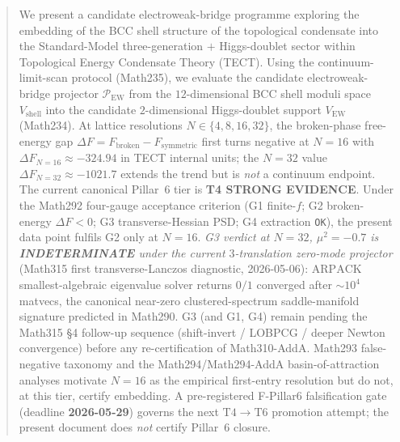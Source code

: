 \begin{abstract}
We present a candidate electroweak-bridge programme exploring the
embedding of the BCC shell structure of the topological condensate
into the Standard-Model three-generation $+$ Higgs-doublet sector
within Topological Energy Condensate Theory (TECT). Using the
continuum-limit-scan protocol (Math235), we evaluate the candidate
electroweak-bridge projector $\mathcal{P}_{\mathrm{EW}}$ from the
$12$-dimensional BCC shell moduli space $V_{\mathrm{shell}}$ into the
candidate $2$-dimensional Higgs-doublet support $V_{\mathrm{EW}}$
(Math234). At lattice resolutions $N \in \{4,8,16,32\}$, the
broken-phase free-energy gap $\Delta F = F_{\mathrm{broken}}-
F_{\mathrm{symmetric}}$ first turns negative at $N=16$ with
$\Delta F_{N=16} \approx -324.94$ in TECT internal units; the $N=32$
value $\Delta F_{N=32}\approx -1021.7$ extends the trend but is
\emph{not} a continuum endpoint. The current canonical Pillar~6 tier
is \textbf{T4 STRONG EVIDENCE}. Under the Math292 four-gauge
acceptance criterion (G1 finite-$f$; G2 broken-energy
$\Delta F<0$; G3 transverse-Hessian PSD;
G4 extraction \texttt{OK}), the present data point fulfils G2 only
at $N=16$. \emph{G3 verdict at $N=32$, $\mu^2=-0.7$ is
\textbf{INDETERMINATE} under the current $3$-translation
zero-mode projector} (Math315 first transverse-Lanczos
diagnostic, 2026-05-06): $\mathrm{ARPACK}$ smallest-algebraic
eigenvalue solver returns $0/1$ converged after
$\sim 10^{4}$ matvecs, the canonical near-zero clustered-spectrum
saddle-manifold signature predicted in Math290. G3 (and G1, G4)
remain pending the Math315 \S 4 follow-up sequence
(shift-invert / LOBPCG / deeper Newton convergence) before any
re-certification of Math310-AddA. Math293 false-negative taxonomy and the
Math294/Math294-AddA basin-of-attraction analyses motivate $N=16$ as
the empirical first-entry resolution but do not, at this tier, certify
embedding. A pre-registered F-Pillar6 falsification gate (deadline
\textbf{2026-05-29}) governs the next $\mathrm{T4}\to\mathrm{T6}$
promotion attempt; the present document does \emph{not} certify
Pillar~6 closure.
\end{abstract}

\maketitle

